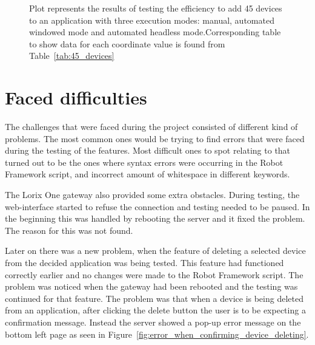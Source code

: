 \begin{figure}[H]
    \caption{Plot represents the results of testing the efficiency to add 45 devices to an application with three execution modes: manual, automated windowed mode and automated headless mode.Corresponding table to show data for each coordinate value is found from Table~\ref{tab:45_devices}}\label{fig:45_devices}
\end{figure}

\clearpage

\section{Faced difficulties}
The challenges that were faced during the project consisted of different kind of problems.
The most common ones would be trying to find errors that were faced during the testing of the features.
Most difficult ones to spot relating to that turned out to be the ones where syntax errors were occurring in the Robot Framework script, and incorrect amount of whitespace in different keywords.

The Lorix One gateway also provided some extra obstacles.
During testing, the web-interface started to refuse the connection and testing needed to be paused.
In the beginning this was handled by rebooting the server and it fixed the problem.
The reason for this was not found.

Later on there was a new problem, when the feature of deleting a selected device from the decided application was being tested.
This feature had functioned correctly earlier and no changes were made to the Robot Framework script. 
The problem was noticed when the gateway had been rebooted and the testing was continued for that feature.
The problem was that when a device is being deleted from an application, after clicking the delete button the user is to be expecting a confirmation message.
Instead the server showed a pop-up error message on the bottom left page as seen in Figure~\ref{fig:error_when_confirming_device_deleting}.

